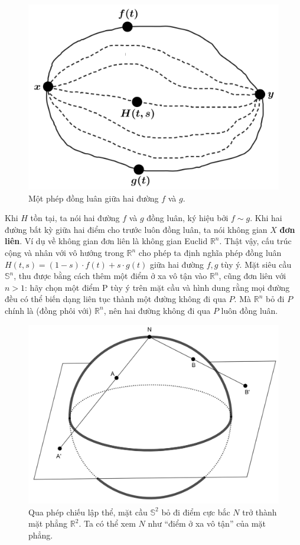 \documentclass[12pt]{article}
\begin{document}
\begin{figure}[h!]
    \centering
    \includegraphics[scale = .25]{h1.png}
    \caption{Một phép đồng luân giữa hai đường $f$ và $g$.}
    \label{h1}
\end{figure}

Khi $H$ tồn tại, ta nói hai đường $f$ và $g$ đồng luân, ký hiệu bởi $f \sim g$. Khi hai đường bất kỳ giữa hai điểm cho trước luôn đồng luân, ta nói không gian $X$ {\bf đơn liên}. Ví dụ về không gian đơn liên là không gian Euclid $\mathbb{R}^n$. Thật vậy, cấu trúc cộng và nhân với vô hướng trong $\mathbb{R}^n$ cho phép ta định nghĩa phép đồng luân $H(t,s) = (1-s) \cdot f(t) + s \cdot g(t)$ giữa hai đường $f, g$ tùy ý. Mặt  siêu cầu $\mathbb{S}^n$, thu được bằng cách thêm một điểm ở xa vô tận vào $\mathbb{R}^n$, cũng đơn liên với $n > 1$: hãy chọn một điểm P tùy ý trên mặt cầu và hình dung rằng mọi đường đều có thể biến dạng liên tục thành một đường không đi qua $P$. Mà $\mathbb{R}^n$ bỏ đi $P$ chính là (đồng phôi với) $\mathbb{R}^n$, nên hai đường không đi qua $P$ luôn đồng luân.

\begin{figure}[h!]
    \centering
    \includegraphics[scale = .2]{h2.png}
    \caption{Qua phép chiếu lập thể, mặt cầu $\mathbb{S}^2$ bỏ đi điểm cực bắc $N$ trở thành mặt phẳng $\mathbb{R}^2$. Ta có thể xem $N$ như ``điểm ở xa vô tận'' của mặt phẳng.}
    \label{h2}
\end{figure}
\end{document}
